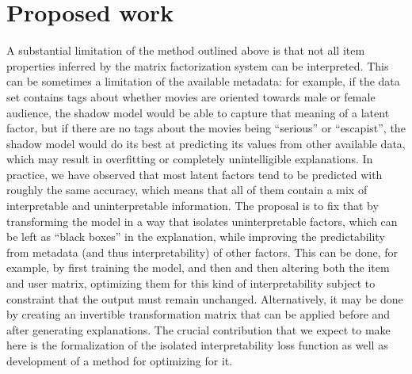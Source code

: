 \section{Proposed work}

A substantial limitation of the method outlined above is that not all
item properties inferred by the matrix factorization system can be interpreted.
This can be sometimes a limitation of the available metadata: for example,
if the data set contains tags about whether movies are oriented towards male or
female audience, the shadow model would be able to capture that meaning of a
latent factor, but if there are no tags about the movies being ``serious'' or
``escapist'', the shadow model would do its best at predicting its values from
other available data, which may result in overfitting or completely
unintelligible explanations. In practice, we have observed that most latent
factors tend to be predicted with roughly the same accuracy, which means that
all of them contain a mix of interpretable and uninterpretable information. The
proposal is to fix that by transforming the model in a way that isolates
uninterpretable factors, which can be left as ``black boxes'' in the
explanation, while improving the predictability from metadata (and thus
interpretability) of other factors. This can be done, for example, by first
training the model, and then and then altering both the item and user matrix,
optimizing them for this kind of interpretability
subject to constraint that the output must remain unchanged. Alternatively, it
may be done by creating an invertible transformation matrix that can be applied
before and after generating explanations. The crucial contribution that we
expect to make here is the formalization of the isolated interpretability loss
function as well as development of a method for optimizing for it.

